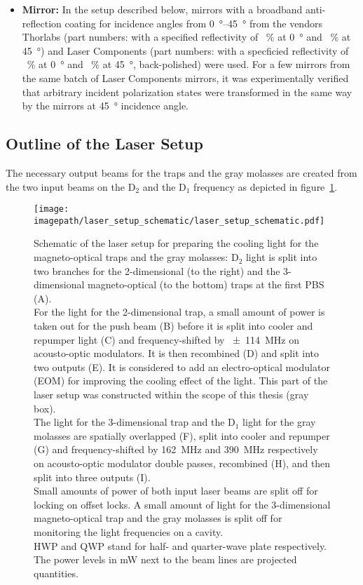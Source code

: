 \begin{itemize}
    \item \textbf{Mirror:} In the setup described below, mirrors with a broadband anti-reflection coating for incidence angles from \SIrange[]{0}{45}{\degree} from the vendors Thorlabs (part numbers: with a specified reflectivity of \SI[]{}{\percent} at \SI[]{0}{\degree} and \SI[]{}{\percent} at \SI[]{45}{\degree}) and Laser Components (part numbers: with a specficied reflectivity of \SI[]{}{\percent} at \SI[]{0}{\degree} and \SI[]{}{\percent} at \SI[]{45}{\degree}, back-polished) were used.  For a few mirrors from the same batch of Laser Components mirrors, it was experimentally verified that arbitrary incident polarization states were transformed in the same way by the mirrors at \SI[]{45}{\degree} incidence angle.
\end{itemize}

\subsection*{Outline of the Laser Setup}
The necessary output beams for the traps and the gray molasses are created from the two input beams on the D$_2$ and the D$_1$ frequency as depicted in figure~\ref{fig:laser_setup_schematic}.

\begin{figure}
    \centering
    \texttt{[image: \\imagepath/laser\_setup\_schematic/laser\_setup\_schematic.pdf]}
    \caption{Schematic of the laser setup for preparing the cooling light for the magneto-optical traps and the gray molasses: D$_2$ light is split into two branches for the 2-dimensional (to the right) and the 3-dimensional magneto-optical (to the bottom) traps at the first PBS (A).\\
    For the light for the 2-dimensional trap, a small amount of power is taken out for the push beam (B) before it is split into cooler and repumper light (C) and frequency-shifted by \SI[]{+-114}{\mega\hertz} on acousto-optic modulators. It is then recombined (D) and split into two outputs (E). It is considered to add an electro-optical modulator (EOM) for improving the cooling effect of the light. This part of the laser setup was constructed within the scope of this thesis (gray box).\\
    The light for the 3-dimensional trap and the D$_1$ light for the gray molasses are spatially overlapped (F), split into cooler and repumper (G) and frequency-shifted by  \SI[]{162}{\mega\hertz} and \SI[]{+390}{\mega\hertz} respectively on acousto-optic modulator double passes, recombined (H), and then split into three outputs (I).\\
    Small amounts of power of both input laser beams are split off for locking on offset locks. A small amount of light for the 3-dimensional magneto-optical trap and the gray molasses is split off for monitoring the light frequencies on a cavity.\\
    HWP and QWP stand for half- and quarter-wave plate respectively. The power levels in \si[]{\milli\watt} next to the beam lines are projected quantities.}
    \label{fig:laser_setup_schematic}
\end{figure}


